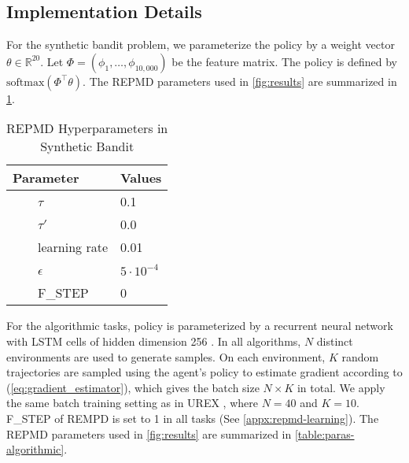 \subsection{Implementation Details}
\label{subsec:implementation}
For the synthetic bandit problem, we parameterize the policy by a weight vector $\theta\in  \mathbb{R}^{20}$. Let $\Phi = \left( \phi_1, \dots, \phi_{10,000} \right)$ be the feature matrix. The policy is defined by $\text{softmax}(\Phi^{\top}\theta)$. The REPMD parameters used in \cref{fig:results} are summarized in \cref{table:paras-bandit}. 
\begin{table}[ht]
\caption{REPMD Hyperparameters in Synthetic Bandit} %
\centering 
\begin{tabular}{l l} 
\hline
Parameter & Values \\ [0.5ex] %
\hline %
\ \ \ \ $\tau$ & 0.1  \\
\ \ \ \ $\tau'$ & 0.0 \\
\ \ \ \ learning rate & 0.01 \\
\ \ \ \ $\epsilon $ & $5\cdot 10^{-4}$ \\
\ \ \ \ F\_STEP & 0 \\
\hline
\end{tabular}
\label{table:paras-bandit} %
\end{table}


For the algorithmic tasks, policy is parameterized by a recurrent neural network with LSTM cells of hidden dimension 256 \citep{hochreiter1997long}. In all algorithms, $N$ distinct environments are used to generate samples. On each environment, $K$ random trajectories are sampled using the agent's policy to estimate gradient according to (\ref{eq:gradient_estimator}), which gives the batch size $N\times K$ in total. We apply the same batch training setting as in UREX \citep{nachum2017improving}, where $N=40$ and $K=10$. F\_STEP of REMPD is set to 1 in all tasks (See \cref{appx:repmd-learning}). The REPMD parameters used in \cref{fig:results} are summarized in \cref{table:paras-algorithmic}. 

